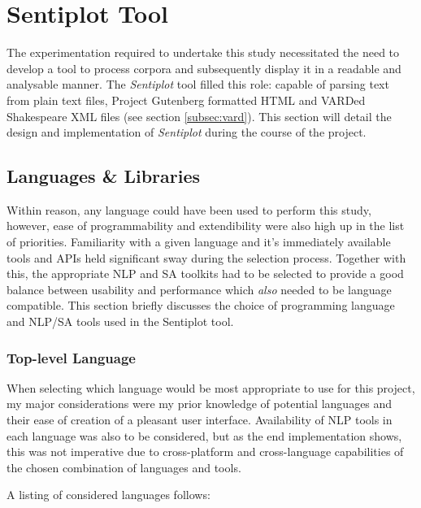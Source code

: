 \documentclass{article}
\begin{document}
\section{Sentiplot Tool}
\label{sec:sentiplot}
The experimentation required to undertake this study necessitated the need to develop a tool to process corpora and subsequently display it in a readable and analysable manner. The \textit{Sentiplot} tool filled this role: capable of parsing text from plain text files, Project Gutenberg formatted HTML and VARDed Shakespeare XML files (see section \ref{subsec:vard}). This section will detail the design and implementation of \textit{Sentiplot} during the course of the project. 
    \subsection{Languages \& Libraries}
    Within reason, any language could have been used to perform this study, however, ease of programmability and extendibility were also high up in the list of priorities. Familiarity with a given language and it's immediately available tools and APIs held significant sway during the selection process. Together with this, the appropriate NLP and SA toolkits had to be selected to provide a good balance between usability and performance which \textit{also} needed to be language compatible. This section briefly discusses the choice of programming language and NLP/SA tools used in the Sentiplot tool.
        \subsubsection{Top-level Language}
        \label{subsec:language}
        When selecting which language would be most appropriate to use for this project, my major considerations were my prior knowledge of potential languages and their ease of creation of a pleasant user interface. Availability of NLP tools in each language was also to be considered, but as the end implementation shows, this was not imperative due to cross-platform and cross-language capabilities of the chosen combination of languages and tools.

        A listing of considered languages follows:
\end{document}
